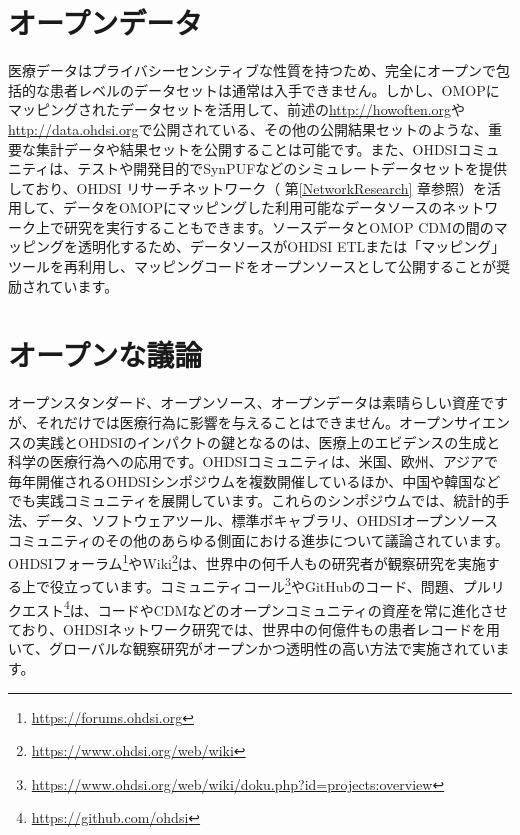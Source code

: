 \documentclass[
  11pt]{book}
\theoremstyle{definition}
\theoremstyle{definition}
\theoremstyle{definition}
\theoremstyle{definition}
\theoremstyle{remark}
\begin{document}
\section{オープンデータ}\label{ux30aaux30fcux30d7ux30f3ux30c7ux30fcux30bf}


医療データはプライバシーセンシティブな性質を持つため、完全にオープンで包括的な患者レベルのデータセットは通常は入手できません。しかし、OMOPにマッピングされたデータセットを活用して、前述の\url{http://howoften.org}や\url{http://data.ohdsi.org}で公開されている、その他の公開結果セットのような、重要な集計データや結果セットを公開することは可能です。また、OHDSIコミュニティは、テストや開発目的でSynPUFなどのシミュレートデータセットを提供しており、OHDSI リサーチネットワーク（ 第\ref{NetworkResearch} 章参照）を活用して、データをOMOPにマッピングした利用可能なデータソースのネットワーク上で研究を実行することもできます。ソースデータとOMOP CDMの間のマッピングを透明化するため、データソースがOHDSI ETLまたは「マッピング」ツールを再利用し、マッピングコードをオープンソースとして公開することが奨励されています。

\section{オープンな議論}\label{ux30aaux30fcux30d7ux30f3ux306aux8b70ux8ad6}


オープンスタンダード、オープンソース、オープンデータは素晴らしい資産ですが、それだけでは医療行為に影響を与えることはできません。オープンサイエンスの実践とOHDSIのインパクトの鍵となるのは、医療上のエビデンスの生成と科学の医療行為への応用です。OHDSIコミュニティは、米国、欧州、アジアで毎年開催されるOHDSIシンポジウムを複数開催しているほか、中国や韓国などでも実践コミュニティを展開しています。これらのシンポジウムでは、統計的手法、データ、ソフトウェアツール、標準ボキャブラリ、OHDSIオープンソースコミュニティのその他のあらゆる側面における進歩について議論されています。OHDSIフォーラム\footnote{\url{https://forums.ohdsi.org}}やWiki\footnote{\url{https://www.ohdsi.org/web/wiki}}は、世界中の何千人もの研究者が観察研究を実施する上で役立っています。コミュニティコール\footnote{\url{https://www.ohdsi.org/web/wiki/doku.php?id=projects:overview}}やGitHubのコード、問題、プルリクエスト\footnote{\url{https://github.com/ohdsi}}は、コードやCDMなどのオープンコミュニティの資産を常に進化させており、OHDSIネットワーク研究では、世界中の何億件もの患者レコードを用いて、グローバルな観察研究がオープンかつ透明性の高い方法で実施されています。
\end{document}
